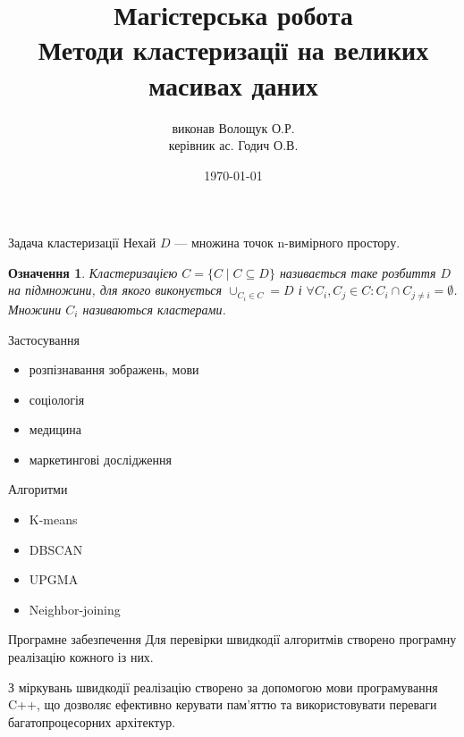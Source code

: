 \documentclass{beamer}
\title{Магістерська робота\\Методи кластеризації на великих масивах даних}
\author{виконав Волощук О.Р.\\керівник ас. Годич О.В.}
\date{\today}
\newtheorem{defn}{Означення}
\begin{document}
    \begin{frame}
        \maketitle
    \end{frame}

    \begin{frame}{Задача кластеризації}
        Нехай $D$ --- множина точок n-вимірного простору. 
        \begin{defn}
            \emph{Кластеризацією} $C = \{C \mid C \subseteq D\}$ називається таке розбиття $D$ на підмножини, 
            для якого виконується $\cup_{C_i \in C} = D$ і $\forall C_i, C_j \in C : C_i \cap C_{j \neq i} = \emptyset$. 
            Множини $C_i$ називаються кластерами.
        \end{defn}
    \end{frame} 
    
    \begin{frame}{Застосування}
        \begin{itemize}
            \item розпізнавання зображень, мови
            \item соціологія
            \item медицина
            \item маркетингові дослідження
        \end{itemize}
    \end{frame}
    
    
    \begin{frame}{Алгоритми}
        \begin{itemize}
            \item K-means
            \item DBSCAN
            \item UPGMA
            \item Neighbor-joining
        \end{itemize}
    \end{frame}
    
    \begin{frame}{Програмне забезпечення}
        Для перевірки швидкодії алгоритмів створено програмну реалізацію кожного із них.
        
        З міркувань швидкодії реалізацію створено за допомогою мови програмування C++, що дозволяє ефективно керувати пам’яттю та використовувати переваги багатопроцесорних архітектур.
    \end{frame}
    
\end{document}
